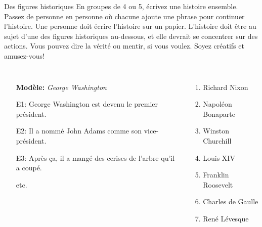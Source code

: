 \begin{frame}{Des figures historiques}
  En groupes de 4 ou 5, écrivez une histoire ensemble.
  Passez de personne en personne où chacune ajoute une phrase pour continuer l'histoire.
  Une personne doit écrire l'histoire sur un papier.
  L'histoire doit être au sujet d'une des figures historiques au-dessous, et elle devrait se concentrer sur des actions.
  Vous pouvez dire la vérité ou mentir, si vous voulez.
  Soyez créatifs et amusez-vous!
  \begin{columns}
      \begin{itemize}
        \item[] \textbf{Modèle:} \emph{George Washington}
        \item[E1:] George Washington est devenu le premier président.
        \item[E2:] Il a nommé John Adams comme son vice-président.
        \item[E3:] Après ça, il a mangé des cerises de l'arbre qu'il a coupé.
        \item[] etc.
      \end{itemize}
      \begin{enumerate}
        \item Richard Nixon
        \item Napoléon Bonaparte
        \item Winston Churchill
        \item Louis XIV
        \item Franklin Roosevelt
        \item Charles de Gaulle
        \item René Lévesque
      \end{enumerate}
  \end{columns}
\end{frame}